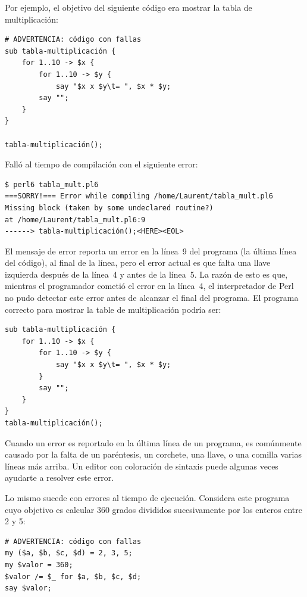 Por ejemplo, el objetivo del siguiente código era mostrar
la tabla de multiplicación:

\begin{lstlisting}
# ADVERTENCIA: código con fallas
sub tabla-multiplicación {
    for 1..10 -> $x {
        for 1..10 -> $y {
            say "$x x $y\t= ", $x * $y;
        say "";
    }
}

tabla-multiplicación();
\end{lstlisting}

Falló al tiempo de compilación con el siguiente error:

\begin{lstlisting}
$ perl6 tabla_mult.pl6
===SORRY!=== Error while compiling /home/Laurent/tabla_mult.pl6
Missing block (taken by some undeclared routine?)
at /home/Laurent/tabla_mult.pl6:9
------> tabla-multiplicación();<HERE><EOL>
\end{lstlisting}

El mensaje de error reporta un error en la línea~9 del 
programa (la última línea del código), al final de la línea,
pero el error actual es que falta una llave izquierda después
de la línea~4 y antes de la línea~5. La razón de esto es que,
mientras el programador cometió el error en la línea~4,
el interpretador de Perl no pudo detectar este error antes 
de alcanzar el final del programa. El programa correcto para mostrar
la table de multiplicación podría ser:

\begin{lstlisting}
sub tabla-multiplicación {
    for 1..10 -> $x {
        for 1..10 -> $y {
            say "$x x $y\t= ", $x * $y;
        }
        say "";
    }
}
tabla-multiplicación();
\end{lstlisting}

Cuando un error es reportado en la última línea de un
programa, es comúnmente causado por la falta de un
paréntesis, un corchete, una llave, o una comilla varias
líneas más arriba. Un editor con coloración de sintaxis
puede algunas veces ayudarte a resolver este error.


Lo mismo sucede con errores al tiempo de ejecución. Considera
este programa cuyo objetivo es calcular 360 grados divididos
sucesivamente por los enteros entre 2 y 5:

\begin{lstlisting}
# ADVERTENCIA: código con fallas
my ($a, $b, $c, $d) = 2, 3, 5;
my $valor = 360;
$valor /= $_ for $a, $b, $c, $d;
say $valor;
\end{lstlisting}

